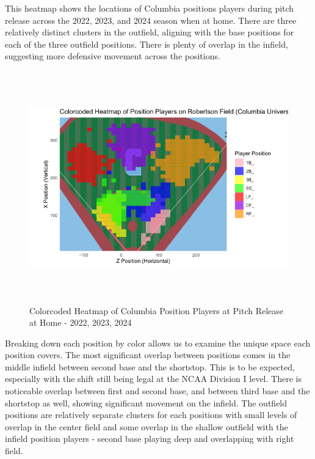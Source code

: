 \documentclass{article}
\begin{document}
\newpage

This heatmap shows the locations of Columbia positions players during pitch release across the 2022, 2023, and 2024 season when at home. There are three relatively distinct clusters in the outfield, aligning with the base positions for each of the three outfield positions. There is plenty of overlap in the infield, suggesting more defensive movement across the positions. 

\vspace{1cm}
\begin{figure}[h]
    \centering        
    \includegraphics[height=10cm]{images/colorcoded_pos_heatmap.png}
    \caption{Colorcoded Heatmap of Columbia Position Players at Pitch Release at Home - 2022, 2023, 2024}
\end{figure}
\vspace{1cm}
\newpage

Breaking down each position by color allows us to examine the unique space each position covers. The most significant overlap between positions comes in the middle infield between second base and the shortstop. This is to be expected, especially with the shift still being legal at the NCAA Division I level. There is noticeable overlap between first and second base, and between third base and the shortstop as well, showing significant movement on the infield. The outfield positions are relatively separate clusters for each positions with small levels of overlap in the center field and some overlap in the shallow outfield with the infield position players - second base playing deep and overlapping with right field. 
\end{document}
